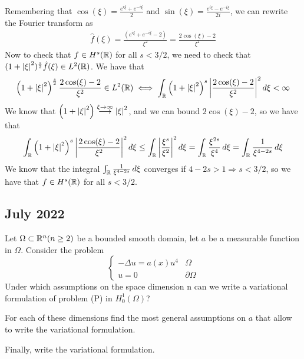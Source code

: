 Remembering that \(\cos(\xi) = \frac{e^{i \xi} + e^{-i \xi}}{2}\) and
\(\sin(\xi) = \frac{e^{i \xi} - e^{-i \xi}}{2i}\), we can rewrite the Fourier
transform as
\[
    \begin{split}
        \hat{f}(\xi) = \frac{(e^{i \xi} + e^{-i \xi} - 2)}{\xi^2} = \frac{2 \cos(\xi) - 2}{\xi^2}
    \end{split}
\]
Now to check that \(f \in H^s(\mathbb{R})\) for all \(s < 3/2\), we need to check
that \((1 + \abs{\xi}^2)^{\frac{s}{2}} \hat{f}(\xi) \in L^2(\mathbb{R})\). We have
that
\[
    \begin{split}
        \left(1 + \abs{\xi}^2\right)^{\frac{s}{2}} \frac{2 \cos(\xi) - 2}{\xi^2}  \in L^2(\mathbb{R}) \iff \int_{\mathbb{R}} \left(1 + \abs{\xi}^2\right)^{s} \abs{\frac{2 \cos(\xi) - 2}{\xi^2}}^2 \, d\xi < \infty
    \end{split}
\]
We know that \(\left(1 + \abs{\xi}^2\right) \overset{\xi \to
    \infty}{\longrightarrow} \abs{\xi}^2\), and we can bound \(2 \cos(\xi) - 2\),
so we have that
\[
    \begin{split}
        \int_{\mathbb{R}} \left(1 + \abs{\xi}^2\right)^{s} \abs{\frac{2 \cos(\xi) - 2}{\xi^2}}^2 \, d\xi  \leq
        \int_{\mathbb{R}} \abs{\frac{\xi^{s}}{\xi^2}}^2 \, d\xi = \int_{\mathbb{R}} \frac{\xi^{2s}}{\xi^4} \, d\xi
        = \int_{\mathbb{R}} \frac{1}{\xi^{4 - 2s}} \, d\xi
    \end{split}
\]
We know that the integral \(\int_{\mathbb{R}} \frac{1}{\xi^{4 - 2s}} \, d\xi\)
converges if \(4 - 2s > 1 \Rightarrow s < 3/2\), so we have that \(f \in
H^s(\mathbb{R})\) for all \(s < 3/2\).

\newpage
\subsection{July 2022}
\begin{exercise}
    Let \(\Omega \subset \mathbb{R}^n (n \geq 2)\) be a bounded smooth domain, let \(a\) be a measurable function in \(\Omega\).
    Consider the problem
    \[
        \begin{cases}
            - \Delta u = a(x) u^4 & \Omega         \\
            u = 0                 & \partial\Omega
        \end{cases}
        \tag*{(P)}
    \]
    Under which assumptions on the space dimension n can we write a variational
    formulation of problem (P) in \(H^1_0(\Omega)\)?

    For each of these dimensions find the most general assumptions on \(a\) that
    allow to write the variational formulation.

    Finally, write the variational formulation.
\end{exercise}

